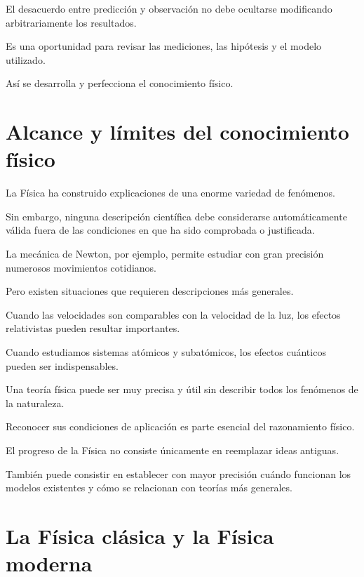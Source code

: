 \begin{interpretacion}

El desacuerdo entre predicción y observación
no debe ocultarse modificando arbitrariamente
los resultados.

Es una oportunidad para revisar
las mediciones, las hipótesis
y el modelo utilizado.

Así se desarrolla y perfecciona
el conocimiento físico.

\end{interpretacion}


\section{Alcance y límites del conocimiento físico}

La Física ha construido explicaciones
de una enorme variedad de fenómenos.

Sin embargo, ninguna descripción científica
debe considerarse automáticamente válida
fuera de las condiciones en que ha sido
comprobada o justificada.

La mecánica de Newton, por ejemplo,
permite estudiar con gran precisión
numerosos movimientos cotidianos.

Pero existen situaciones que requieren
descripciones más generales.

Cuando las velocidades son comparables
con la velocidad de la luz, los efectos
relativistas pueden resultar importantes.

Cuando estudiamos sistemas atómicos
y subatómicos, los efectos cuánticos
pueden ser indispensables.

\begin{idea}

Una teoría física puede ser muy precisa
y útil sin describir todos los fenómenos
de la naturaleza.

Reconocer sus condiciones de aplicación
es parte esencial del razonamiento físico.

\end{idea}

El progreso de la Física no consiste únicamente
en reemplazar ideas antiguas.

También puede consistir en establecer
con mayor precisión cuándo funcionan
los modelos existentes y cómo se relacionan
con teorías más generales.


\section{La Física clásica y la Física moderna}


